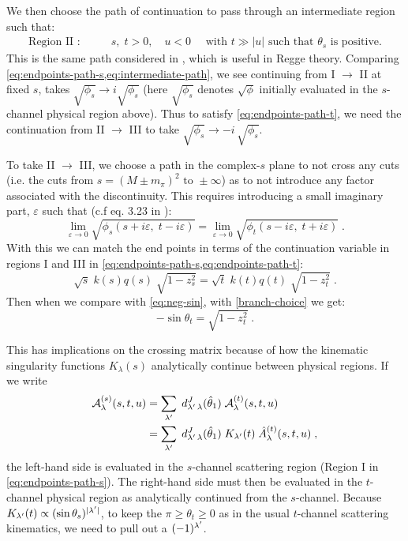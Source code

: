 We then choose the path of continuation to pass through an intermediate region such that:
  \begin{align} \label{eq:intermediate-path}
    \text{Region II :}& \qquad s, \; t > 0, \quad  u  < 0  \quad\text{ with } t \gg |u| \text{ such that } \theta_s \text{ is positive}.
  \end{align}
This is the same path considered in \cite{FoxThesis}, which is useful in Regge theory. Comparing \cref{eq:endpoints-path-s,eq:intermediate-path}, we see continuing from I \(\to\) II at fixed \(s\), takes \(\sqrt{\phi_s} \to i \sqrt{\phi_s}\)
 (here \(\sqrt{\phi_s}\) denotes \(\sqrt{\phi}\) initially evaluated in the \(s\)-channel physical region above). Thus to satisfy \cref{eq:endpoints-path-t}, we need the continuation from II \(\to\) III to take \(\sqrt{\phi_s} \to - i \, \sqrt{\phi_s}\).

 To take II \(\to\) III, we choose a path in the complex-\(s\) plane to not cross any cuts (i.e. the cuts from \(s = (M\pm m_\pi)^2 \text{ to } \pm \infty\)) as to not introduce any factor associated with the discontinuity. This requires introducing a small imaginary part, \(\varepsilon\) such that (c.f eq. 3.23 in \cite{Brunet1966}):
  \begin{equation}
    \lim_{\varepsilon \to 0} \sqrt{\phi_s(s + i \varepsilon, \; t - i \varepsilon)} =
    \lim_{\varepsilon \to 0} \sqrt{\phi_t(s - i \varepsilon, \; t + i \varepsilon)} \; .
  \end{equation}
 With this we can match the end points in terms of the continuation variable in regions I and III in \cref{eq:endpoints-path-s,eq:endpoints-path-t}:
  \begin{equation}
    \sqrt{s} \; k(s) q(s) \; \sqrt{1 - z_s^2} = \sqrt{t} \; k(t) q(t) \; \sqrt{1-z_t^2} \; .
  \end{equation}
Then when we compare with \cref{eq:neg-sin}, with \cref{branch-choice} we get:
    \begin{equation} \label{theta_minus}
      - \sin\theta_t = \sqrt{1 - z_t^2} \; .
    \end{equation}

This has implications on the crossing matrix because of how the kinematic singularity functions \(K_\lambda(s)\) analytically continue between physical regions. If we write
  \begin{align}
    \mathcal{A}^{(s)}_\lambda(s,t,u) &= \sum_{{\lambda^\prime}} \; d_{{\lambda^\prime} \, \lambda}^J(\hat{\theta}_1) \; \mathcal{A}_\lambda^{(t)}(s,t,u) \nonumber \\
    &= \sum_{{\lambda^\prime}} \; d_{{\lambda^\prime} \, \lambda}^J(\hat{\theta}_1) \; K_{\lambda^\prime}(t) \; \hat{A}_\lambda^{(t)}(s,t,u)
    \; ,
  \end{align}
the left-hand side is evaluated in the \(s\)-channel scattering region (Region I in \cref{eq:endpoints-path-s}). The right-hand side must then be evaluated in the \(t\)-channel physical region as analytically continued from the \(s\)-channel. Because \(K_{\lambda^\prime}(t) \propto (\sin\theta_s)^{|{\lambda^\prime}|}\), to keep the \(\pi \geq \theta_t \geq 0\) as in the usual \(t\)-channel scattering kinematics, we need to pull out a \((-1)^{{\lambda^\prime}}\).

